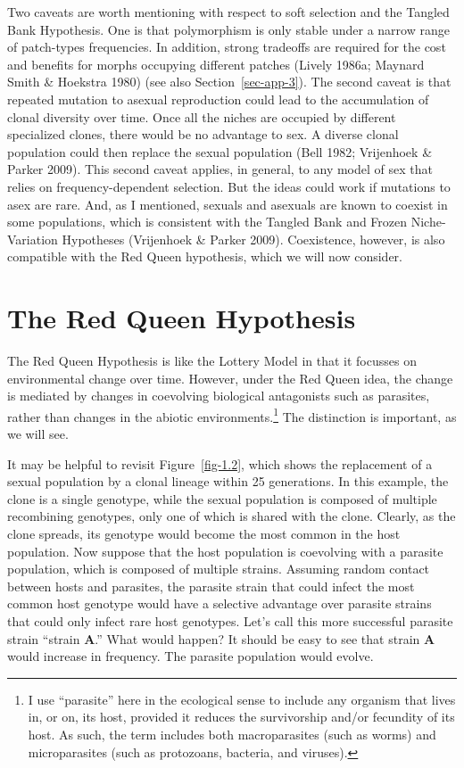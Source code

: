 \documentclass[
  letterpaper,
]{book}
\begin{document}
Two caveats are worth mentioning with respect to soft selection and the
Tangled Bank Hypothesis. One is that polymorphism is only stable under a
narrow range of patch-types frequencies. In addition, strong tradeoffs
are required for the cost and benefits for morphs occupying different
patches (Lively 1986a; Maynard Smith \& Hoekstra 1980) (see also
Section~\ref{sec-app-3}). The second caveat is that repeated mutation to
asexual reproduction could lead to the accumulation of clonal diversity
over time. Once all the niches are occupied by different specialized
clones, there would be no advantage to sex. A diverse clonal population
could then replace the sexual population (Bell 1982; Vrijenhoek \&
Parker 2009). This second caveat applies, in general, to any model of
sex that relies on frequency-dependent selection. But the ideas could
work if mutations to asex are rare. And, as I mentioned, sexuals and
asexuals are known to coexist in some populations, which is consistent
with the Tangled Bank and Frozen Niche-Variation Hypotheses (Vrijenhoek
\& Parker 2009). Coexistence, however, is also compatible with the Red
Queen hypothesis, which we will now consider.

\section{The Red Queen Hypothesis}\label{the-red-queen-hypothesis}

The Red Queen Hypothesis is like the Lottery Model in that it focusses
on environmental change over time. However, under the Red Queen idea,
the change is mediated by changes in coevolving biological antagonists
such as parasites, rather than changes in the abiotic
environments.\footnote{I use ``parasite'' here in the ecological sense
  to include any organism that lives in, or on, its host, provided it
  reduces the survivorship and/or fecundity of its host. As such, the
  term includes both macroparasites (such as worms) and microparasites
  (such as protozoans, bacteria, and viruses).} The distinction is
important, as we will see.

It may be helpful to revisit Figure~\ref{fig-1.2}, which shows the
replacement of a sexual population by a clonal lineage within 25
generations. In this example, the clone is a single genotype, while the
sexual population is composed of multiple recombining genotypes, only
one of which is shared with the clone. Clearly, as the clone spreads,
its genotype would become the most common in the host population. Now
suppose that the host population is coevolving with a parasite
population, which is composed of multiple strains. Assuming random
contact between hosts and parasites, the parasite strain that could
infect the most common host genotype would have a selective advantage
over parasite strains that could only infect rare host genotypes. Let's
call this more successful parasite strain ``strain \textbf{A}.'' What
would happen? It should be easy to see that strain \textbf{A} would
increase in frequency. The parasite population would evolve.
\end{document}

